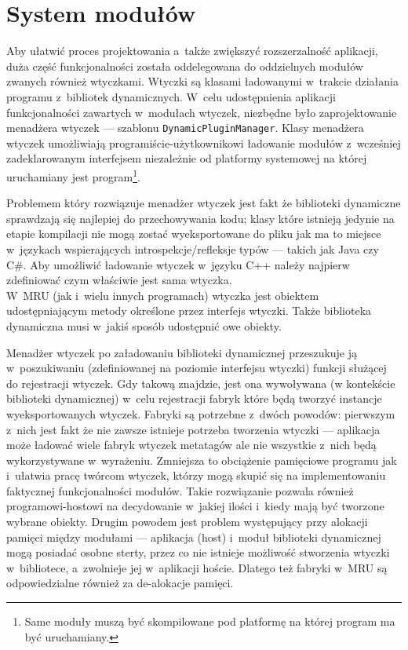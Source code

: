 \section{System modułów}
\label{system-modulow}
\par
Aby ułatwić proces projektowania a~także zwiększyć rozszerzalność aplikacji, duża część funkcjonalności została oddelegowana do oddzielnych modułów zwanych również wtyczkami.
Wtyczki są klasami ładowanymi w~trakcie działania programu z~bibliotek dynamicznych.
W~celu udostępnienia aplikacji funkcjonalności zawartych w~modułach wtyczek, niezbędne było zaprojektowanie menadżera wtyczek --- szablonu \texttt{DynamicPluginManager}.
Klasy menadżera wtyczek umożliwiają programiście-użytkownikowi ładowanie modułów z~wcześniej zadeklarowanym interfejsem niezależnie od platformy systemowej na której uruchamiany jest program\footnote{Same moduły muszą być skompilowane pod platformę na której program ma być uruchamiany.}.

\par
Problemem który rozwiązuje menadżer wtyczek jest fakt że biblioteki dynamiczne  sprawdzają się najlepiej do przechowywania kodu; klasy które istnieją jedynie na etapie kompilacji nie mogą zostać wyeksportowane do pliku jak ma to miejsce w~językach wspierających introspekcje/refleksje typów --- takich jak Java czy C\#.
Aby umożliwić ładowanie wtyczek w~języku C++ należy najpierw zdefiniować czym właściwie jest sama wtyczka.\\

W~MRU (jak i~wielu innych programach) wtyczka jest obiektem udostępniającym metody określone przez interfejs wtyczki. Także biblioteka dynamiczna musi w~jakiś sposób udostępnić owe obiekty.

\par
Menadżer wtyczek po załadowaniu biblioteki dynamicznej przeszukuje ją w~poszukiwaniu (zdefiniowanej na poziomie interfejsu wtyczki) funkcji służącej do rejestracji wtyczek. Gdy takową znajdzie, jest ona wywoływana (w kontekście biblioteki dynamicznej) w~celu rejestracji fabryk które będą tworzyć instancje wyeksportowanych wtyczek.
Fabryki są potrzebne z~dwóch powodów: pierwszym z~nich jest fakt że nie zawsze istnieje potrzeba tworzenia wtyczki --- aplikacja może ładować wiele fabryk wtyczek metatagów ale nie wszystkie z~nich będą wykorzystywane w~wyrażeniu.
Zmniejsza to obciążenie pamięciowe programu jak i~ułatwia pracę twórcom wtyczek, którzy mogą skupić się na implementowaniu faktycznej funkcjonalności modułów. Takie rozwiązanie pozwala również programowi-hostowi na decydowanie w~jakiej ilości i~kiedy mają być tworzone wybrane obiekty.
Drugim powodem jest problem występujący przy alokacji pamięci między modułami --- aplikacja (host) i~moduł biblioteki dynamicznej mogą posiadać osobne sterty, przez co nie istnieje możliwość stworzenia wtyczki w~bibliotece, a~zwolnieje jej w~aplikacji hoście. Dlatego też fabryki w~MRU są odpowiedzialne również za de-alokacje pamięci.

